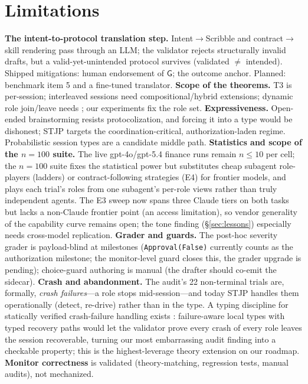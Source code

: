 \documentclass{article}
\newcommand{\gtG}{\mathsf{G}}
\newcommand{\stjp}{\textsc{STJP}}
\begin{document}
\section{Limitations}\label{sec:limits}
\textbf{The intent-to-protocol translation step.} Intent$\to$Scribble and contract$\to$skill rendering pass through an LLM; the validator rejects structurally invalid drafts, but a valid-yet-unintended protocol survives (validated $\neq$ intended). Shipped mitigations: human endorsement of $\gtG$; the outcome anchor. Planned: benchmark item 5 and a fine-tuned translator. \textbf{Scope of the theorems.} T3 is per-session; interleaved sessions need compositional/hybrid extensions; dynamic role join/leave needs \citep{denielou11}; our experiments fix the role set. \textbf{Expressiveness.} Open-ended brainstorming resists protocolization, and forcing it into a type would be dishonest; \stjp{} targets the coordination-critical, authorization-laden regime. Probabilistic session types are a candidate middle path. \textbf{Statistics and scope of the $n{=}100$ suite.} The live gpt-4o/gpt-5.4 finance runs remain $n\leq10$ per cell; the $n{=}100$ suite fixes the statistical power but substitutes cheap subagent role-players (ladders) or contract-following strategies (E4) for frontier models, and plays each trial's roles from one subagent's per-role views rather than truly independent agents. The E3 sweep now spans three Claude tiers on both tasks but lacks a non-Claude frontier point (an access limitation), so vendor generality of the capability curve remains open; the tone finding (\S\ref{sec:lessons}) especially needs cross-model replication. \textbf{Grader and guards.} The post-hoc severity grader is payload-blind at milestones (\texttt{Approval(False)} currently counts as the authorization milestone; the monitor-level guard closes this, the grader upgrade is pending); choice-guard authoring is manual (the drafter should co-emit the sidecar). \textbf{Crash and abandonment.} The audit's 22 non-terminal trials are, formally, \emph{crash failures}---a role stops mid-session---and today \stjp{} handles them operationally (detect, re-drive) rather than in the type. A typing discipline for statically verified crash-failure handling exists \citep{viering18}: failure-aware local types with typed recovery paths would let the validator prove every crash of every role leaves the session recoverable, turning our most embarrassing audit finding into a checkable property; this is the highest-leverage theory extension on our roadmap. \textbf{Monitor correctness} is validated (theory-matching, regression tests, manual audits), not mechanized.
\end{document}
